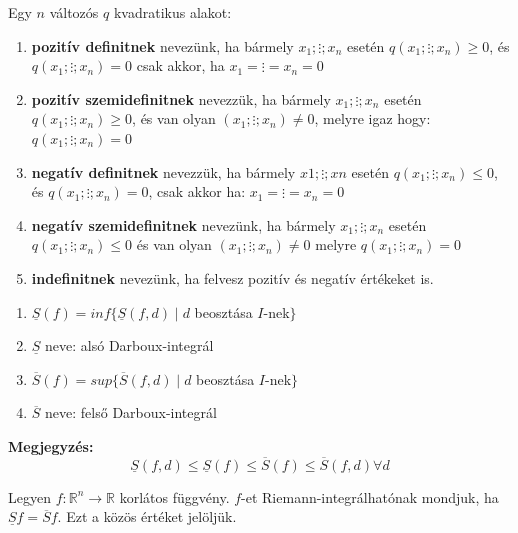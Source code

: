 \documentclass[11pt,a4paper]{article}
\begin{document}
\begin{tcolorbox}[colback=blue!5!white,colframe=blue!70!black,title= 8. Kvadratikus formák definitsége]
Egy \(n\) változós \(q\) kvadratikus alakot:
\begin{enumerate}
    \item \textbf{pozitív definitnek} nevezünk, ha bármely \(x_1; \vdots ; x_n\) esetén \(q(x_1; \vdots ; x_n) \geq 0\), és \(q(x_1; \vdots ; x_n) = 0\) csak akkor,
    ha \(x_1 = \vdots = x_n = 0\)
    \item \textbf{pozitív szemidefinitnek} nevezzük, ha bármely \(x_1; \vdots ; x_n\) esetén \(q(x_1; \vdots ; x_n) \geq 0\), és van olyan \((x_1; \vdots ; x_n) \neq 0\),
    melyre igaz hogy: \(q(x_1; \vdots ; x_n) = 0\)
    \item \textbf{negatív definitnek} nevezzük, ha bármely \(x1; \vdots ; xn\) esetén \(q(x_1; \vdots ; x_n) \leq 0\), és \(q(x_1;\vdots ; x_n) = 0\), csak akkor
    ha: \(x_1 = \vdots = x_n = 0\)
    \item \textbf{negatív szemidefinitnek} nevezünk, ha bármely \(x_1;\vdots ; x_n\) esetén \(q(x_1; \vdots ; x_n) \leq 0\) és van olyan \((x_1; \vdots ; x_n) \neq 0\)
    melyre \(q(x_1; \vdots ; x_n) = 0\)
    \item \textbf{indefinitnek} nevezünk, ha felvesz pozitív és negatív értékeket is.
\end{enumerate}
\end{tcolorbox}
\begin{tcolorbox}[colback=blue!5!white,colframe=blue!70!black,title= 9. Riemann-integrálhatóság (alsó-felső Darboux-integrál)]
\begin{enumerate}
    \item \(\underline{S}(f) = inf\{\underline{S}(f,d)\mid d\) beosztása \(I\)-nek\(\}\)
    \item \(\underline{S}\) neve: alsó Darboux-integrál
    \item \(\overline{S}(f) = sup\{\overline{S}(f,d)\mid d\) beosztása \(I\)-nek\(\}\)
    \item \(\overline{S}\) neve: felső Darboux-integrál
\end{enumerate}
\textbf{Megjegyzés:}
$$\underline{S}(f,d) \leq \underline{S}(f) \leq \overline{S}(f) \leq \overline{S}(f,d) \forall d $$

Legyen \(f : \mathbb{R}^n \to \mathbb{R}\) korlátos függvény. \(f\)-et Riemann-integrálhatónak mondjuk, ha \(\underline{S}f = \overline{S}f\). Ezt a közös értéket
jelöljük.\\
\begin{center}
    \\
\end{center}
\end{tcolorbox}
\end{document}
